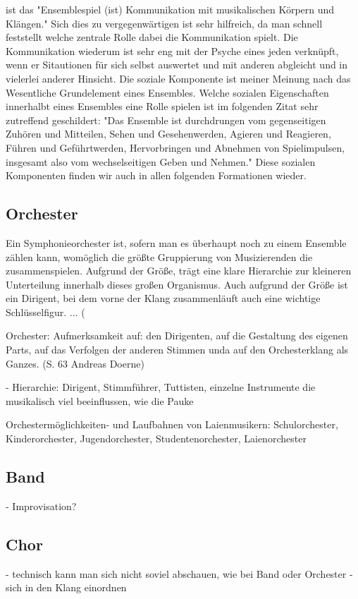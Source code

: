ist das "Ensemblespiel (ist) Kommunikation
mit musikalischen Körpern und Klängen." \autocite[62]{doerne:umfassend_musizieren}
Sich dies zu vergegenwärtigen ist sehr hilfreich, da man schnell feststellt
welche zentrale Rolle dabei die Kommunikation spielt. Die Kommunikation wiederum
ist sehr eng mit der Psyche eines jeden verknüpft, wenn er Sitautionen für sich
selbst auswertet und mit anderen abgleicht und in vielerlei anderer Hinsicht.
Die soziale Komponente ist meiner Meinung nach das Wesentliche Grundelement
eines Ensembles. Welche sozialen Eigenschaften innerhalbt eines Ensembles eine
Rolle spielen ist im folgenden Zitat sehr zutreffend geschildert:
"Das Ensemble ist durchdrungen vom gegenseitigen Zuhören und Mitteilen, Sehen
und Gesehenwerden, Agieren und Reagieren, Führen und Geführtwerden, Hervorbringen
und Abnehmen von Spielimpulsen, insgesamt also vom wechselseitigen Geben und
Nehmen." \autocite[62]{doerne:umfassend_musizieren} Diese sozialen Komponenten
finden wir auch in allen folgenden Formationen wieder. 


\subsection{Orchester} 

Ein Symphonieorchester ist, sofern man es überhaupt noch zu einem Ensemble
zählen kann, womöglich die größte Gruppierung von Musizierenden die
zusammenspielen. Aufgrund der Größe, trägt eine klare Hierarchie zur kleineren
Unterteilung innerhalb dieses großen Organismus. Auch aufgrund der Größe ist ein
Dirigent, bei dem vorne der Klang zusammenläuft auch eine wichtige
Schlüsselfigur. ... (%

Orchester:
Aufmerksamkeit auf: den Dirigenten, auf die Gestaltung des eigenen Parts, auf
das Verfolgen der anderen Stimmen unda auf den Orchesterklang als Ganzes. (S. 63
Andreas Doerne)

- Hierarchie: Dirigent, Stimmführer, Tuttisten, einzelne Instrumente die
musikalisch viel beeinflussen, wie die Pauke

Orchestermöglichkeiten- und Laufbahnen von Laienmusikern:
Schulorchester, Kinderorchester, Jugendorchester, Studentenorchester, Laienorchester


\subsection{Band}
- Improvisation?


\subsection{Chor}
- technisch kann man sich nicht soviel abschauen, wie bei Band oder Orchester
- sich in den Klang einordnen


